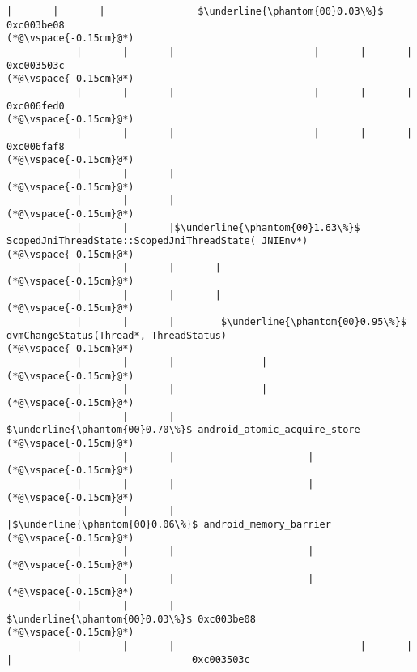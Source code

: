 \begin{lstlisting}[caption=Unicode-merkkijonon osoitinoperaatio, label=profile:C2JReadUnicode-512, numberbychapter=true, frame=lines, float, floatplacement=t]
            |       |       |                $\underline{\phantom{00}0.03\%}$ 0xc003be08
(*@\vspace{-0.15cm}@*)
            |       |       |                        |       |       |                       0xc003503c
(*@\vspace{-0.15cm}@*)
            |       |       |                        |       |       |                       0xc006fed0
(*@\vspace{-0.15cm}@*)
            |       |       |                        |       |       |                       0xc006faf8
(*@\vspace{-0.15cm}@*)
            |       |       |
(*@\vspace{-0.15cm}@*)
            |       |       |
(*@\vspace{-0.15cm}@*)
            |       |       |$\underline{\phantom{00}1.63\%}$ ScopedJniThreadState::ScopedJniThreadState(_JNIEnv*)
(*@\vspace{-0.15cm}@*)
            |       |       |       |
(*@\vspace{-0.15cm}@*)
            |       |       |       |
(*@\vspace{-0.15cm}@*)
            |       |       |        $\underline{\phantom{00}0.95\%}$ dvmChangeStatus(Thread*, ThreadStatus)
(*@\vspace{-0.15cm}@*)
            |       |       |               |
(*@\vspace{-0.15cm}@*)
            |       |       |               |
(*@\vspace{-0.15cm}@*)
            |       |       |                $\underline{\phantom{00}0.70\%}$ android_atomic_acquire_store
(*@\vspace{-0.15cm}@*)
            |       |       |                       |
(*@\vspace{-0.15cm}@*)
            |       |       |                       |
(*@\vspace{-0.15cm}@*)
            |       |       |                       |$\underline{\phantom{00}0.06\%}$ android_memory_barrier
(*@\vspace{-0.15cm}@*)
            |       |       |                       |
(*@\vspace{-0.15cm}@*)
            |       |       |                       |
(*@\vspace{-0.15cm}@*)
            |       |       |                        $\underline{\phantom{00}0.03\%}$ 0xc003be08
(*@\vspace{-0.15cm}@*)
            |       |       |                                |       |       |                               0xc003503c

\end{lstlisting}
